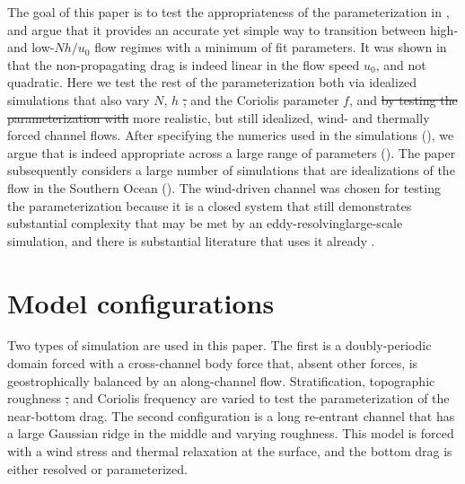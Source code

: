 \documentclass[twocol]{ametsocV5}
\providecommand{\DIFadd}[1]{{\protect\color{blue}\uwave{#1}}} %
\providecommand{\DIFdel}[1]{{\protect\color{red}\sout{#1}}}                      %
\providecommand{\DIFaddbegin}{} %
\providecommand{\DIFaddend}{} %
\providecommand{\DIFdelbegin}{} %
\providecommand{\DIFdelend}{} %
\begin{document}
The goal of this paper is to test the appropriateness of the parameterization in , and argue that it provides an accurate yet simple way to transition between high- and low-$Nh/u_0$ flow regimes with a minimum of fit parameters.  It was shown in \citet{klymak18} that the non-propagating drag is indeed linear in the flow speed $u_0$, and not quadratic.  Here we test the rest of the parameterization both via idealized simulations that also vary $N$, $h$ \DIFdelbegin \DIFdel{, }\DIFdelend and the Coriolis parameter $f$, and \DIFdelbegin \DIFdel{by testing the parameterization with }\DIFdelend \DIFaddbegin \DIFadd{via }\DIFaddend more realistic, but still idealized, wind- and thermally forced channel flows.  After specifying the numerics used in the simulations (), we argue that  is indeed appropriate across a large range of parameters ().  The paper subsequently considers a large number of simulations that are idealizations of the flow in the Southern Ocean  ().  The wind-driven channel was chosen for testing the parameterization because it is a closed system that still demonstrates substantial complexity that may be met by an eddy-resolving\DIFaddbegin \DIFadd{, }\DIFaddend large-scale simulation, and there is substantial literature that uses it already \citep[i.e.][]{abernatheycessi14,Marshall_2017}.   





\section{Model configurations}
\label{sec:Model}

Two types of simulation are used in this paper.  The first is a doubly-periodic domain forced with a cross-channel body force that, absent other forces, is geostrophically balanced by an along-channel flow.  Stratification, topographic roughness \DIFdelbegin \DIFdel{, }\DIFdelend and Coriolis frequency are varied to test the parameterization of the near-bottom drag.  The second configuration is a long re-entrant channel that has a large Gaussian ridge in the middle and varying roughness. This model is forced with a wind stress and thermal relaxation at the surface, and the bottom drag is either resolved or parameterized.  
\end{document}
